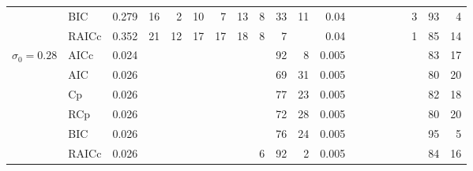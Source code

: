 \documentclass[11pt]{article}
\begin{document}
{\begin{table}[!ht]
\begin{tabular}{clrrrrrrrrr|rrrrrrrrr}
      & BIC   & 0.279 & 16    & 2     & 10    & 7     & 13    & 8     & 33    & 11    & 0.04  &       &       &       &       &       & 3     & 93    & 4 \\
      & RAICc & 0.352 & 21    & 12    & 17    & 17    & 18    & 8     & 7     &       & 0.04  &       &       &       &       &       & 1     & 85    & 14 \\
\midrule
\multirow{6}[1]{*}{$\sigma_0=0.28$} & AICc  & 0.024 &       &       &       &       &       &       & 92    & 8     & 0.005 &       &       &       &       &       &       & 83    & 17 \\
      & AIC   & 0.026 &       &       &       &       &       &       & 69    & 31    & 0.005 &       &       &       &       &       &       & 80    & 20 \\
      & Cp    & 0.026 &       &       &       &       &       &       & 77    & 23    & 0.005 &       &       &       &       &       &       & 82    & 18 \\
      & RCp   & 0.026 &       &       &       &       &       &       & 72    & 28    & 0.005 &       &       &       &       &       &       & 80    & 20 \\
      & BIC   & 0.026 &       &       &       &       &       &       & 76    & 24    & 0.005 &       &       &       &       &       &       & 95    & 5 \\
      & RAICc & 0.026 &       &       &       &       &       & 6     & 92    & 2     & 0.005 &       &       &       &       &       &       & 84    & 16 \\
\end{tabular}%


\end{table}





\clearpage
}
\end{document}
